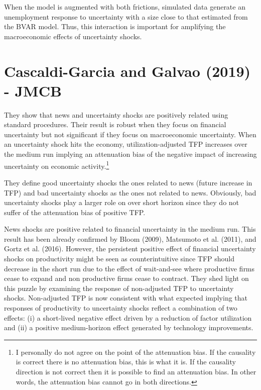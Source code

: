 \documentclass{article}
\begin{document}
{When the model is augmented with both frictions, simulated data generate an unemployment response to uncertainty with a size close to that estimated from the BVAR model. Thus, this interaction is important for amplifying the macroeconomic effects of uncertainty shocks. 



\section{Cascaldi-Garcia and Galvao (2019) - JMCB}

They show that news and uncertainty shocks are positively related using standard procedures. Their result is robust when they focus on financial uncertainty but not significant if they focus on macroeconomic uncertainty. When an uncertainty shock hits the economy, utilization-adjusted TFP increases over the medium run implying an attenuation bias of the negative impact of increasing uncertainty on economic activity.\footnote{I personally do not agree on the point of the attenuation bias. If the causality is correct there is no attenuation bias, this is what it is. If the causality direction is not correct then it is possible to find an attenuation bias. In other words, the attenuation bias cannot go in both directions.}

They define good uncertainty shocks the ones related to news (future increase in TFP) and bad uncertainty shocks as the ones not related to news. Obviously, bad uncertainty shocks play a larger role on over short horizon since they do not suffer of the attenuation bias of positive TFP.

News shocks are positive related to financial uncertainty in the medium run. This result has been already confirmed by Bloom (2009), Matsumoto et al. (2011), and Gortz et al. (2016). However, the persistent positive effect of financial uncertainty shocks on productivity might be seen as counterintuitive since TFP should decrease in the short run due to the effect of wait-and-see where productive firms cease to expand and non productive firms cease to contract. They shed light on this puzzle by examining the response of non-adjusted TFP to uncertainty shocks. Non-adjusted TFP is now consistent with what expected implying that responses of productivity to uncertainty shocks reflect a combination of two effects: (i) a short-lived negative effect driven by a reduction of factor utilization and (ii) a positive medium-horizon effect generated by technology improvements.  

}
\end{document}
